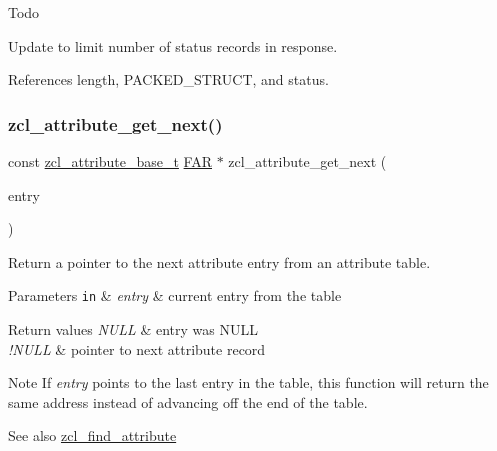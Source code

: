 \begin{DoxyRefDesc}{Todo}
\item[\hyperlink{todo__todo000022}{Todo}]Update to limit number of status records in response. \end{DoxyRefDesc}


References length, P\+A\+C\+K\+E\+D\+\_\+\+S\+T\+R\+U\+CT, and status.

\mbox{\label{group__zcl_ga66d9c3c646422e71fed6c94d67c14fdd}} 
\subsubsection{\texorpdfstring{zcl\+\_\+attribute\+\_\+get\+\_\+next()}{zcl\_attribute\_get\_next()}}
{\footnotesize\ttfamily const \hyperlink{structzcl__attribute__base__t}{zcl\+\_\+attribute\+\_\+base\+\_\+t} \hyperlink{group__hal_gaef060b3456fdcc093a7210a762d5f2ed}{F\+AR} $\ast$ zcl\+\_\+attribute\+\_\+get\+\_\+next (\begin{DoxyParamCaption}\item[{const \hyperlink{structzcl__attribute__base__t}{zcl\+\_\+attribute\+\_\+base\+\_\+t} \hyperlink{group__hal_gaef060b3456fdcc093a7210a762d5f2ed}{F\+AR} $\ast$}]{entry }\end{DoxyParamCaption})}



Return a pointer to the next attribute entry from an attribute table. 


\begin{DoxyParams}[1]{Parameters}
\mbox{\tt in}  & {\em entry} & current entry from the table\\
\hline
\end{DoxyParams}

\begin{DoxyRetVals}{Return values}
{\em N\+U\+LL} & entry was N\+U\+LL \\
\hline
{\em !\+N\+U\+LL} & pointer to next attribute record\\
\hline
\end{DoxyRetVals}
\begin{DoxyNote}{Note}
If {\itshape entry} points to the last entry in the table, this function will return the same address instead of advancing off the end of the table.
\end{DoxyNote}
\begin{DoxySeeAlso}{See also}
\hyperlink{group__zcl_ga00ac8dd36cad01d9479a84c296380f40}{zcl\+\_\+find\+\_\+attribute} 
\end{DoxySeeAlso}


